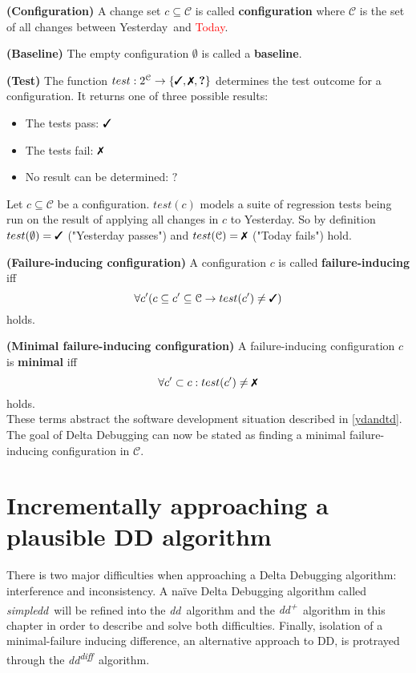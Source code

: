 \documentclass[a4paper,UKenglish]{lipics-v2018}
\newcommand{\sdd}[0]{\textit{simpledd}}
\newcommand{\dd}[0]{\textit{dd}}
\newcommand{\ddp}{\textit{dd\textsuperscript{+}}}
\newcommand{\dddiff}{\textit{dd\textsuperscript{diff}}}
\newcommand{\green}[1]{\textcolor{td-green}{#1}}
\newcommand{\red}[1]{\textcolor{red}{#1}}
\newcommand{\yd}[0]{\green{Yesterday}}
\newcommand{\td}[0]{\red{Today}}
\newcommand{\C}[0]{\ensuremath{\mathcal{C}}}
\newcommand{\cmark}{\text{\ding{51}}}
\newcommand{\xmark}{\text{\ding{55}}}
\newcommand{\qmark}{\textbf{?}}
\newcommand{\defsub}[1]{\textbf{(#1)} }
\newcommand{\set}[1]{\left \{ #1 \right \}}
\begin{document}
 \defsub{Configuration} A change set $c \subseteq \C$ is called \textbf{configuration} where $\C$ is the set of all changes between \yd\ and \td.

 \defsub{Baseline} The empty configuration $\emptyset$ is called a \textbf{baseline}.

 \defsub{Test} The function $test: 2^{\C} \to \set{\cmark, \xmark, \qmark}$ determines the test outcome for a configuration. It returns one of three possible results: 
\begin{itemize}
	\item The tests pass: $\cmark$
	\item The tests fail: $\xmark$
	\item No result can be determined: $\qmark$
\end{itemize} 

Let $c \subseteq \C$ be a configuration. $test(c)$ models a suite of regression tests being run on the result of applying all changes in $c$ to \yd. So by definition $test(\emptyset) = \cmark$ ("Yesterday passes") and $test(\C) = \xmark$ ("Today fails") hold.

 \defsub{Failure-inducing configuration} A configuration $c$ is called \textbf{failure-inducing} iff 
\[ \forall c' (c \subseteq c' \subseteq \C \rightarrow test(c') \ne \cmark) \] 
holds.

 \defsub{Minimal failure-inducing configuration} A failure-inducing configuration $c$ is \textbf{minimal} iff 
\[ \forall c' \subset c: test(c') \ne \xmark \]
holds.\\


These terms abstract the software development situation described in \ref{ydandtd}. The goal of Delta Debugging can now be stated as finding a minimal failure-inducing configuration in $\C$.

\section{Incrementally approaching a plausible DD algorithm}

There is two major difficulties when approaching a Delta Debugging algorithm: interference and inconsistency. A na\"ive Delta Debugging algorithm called \sdd\ will be refined into the \dd\ algorithm and the \ddp\ algorithm in this chapter in order to describe and solve both difficulties. Finally, isolation of a minimal-failure inducing difference, an alternative approach to DD, is protrayed through the \dddiff\ algorithm.
\end{document}
